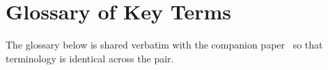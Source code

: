 \documentclass{article}
\begin{document}
\section{Glossary of Key Terms}
\label{appendix:glossary}

The glossary below is shared verbatim with the companion paper~\citep{aravind2026epi} so that terminology is identical across the pair.





\end{document}
